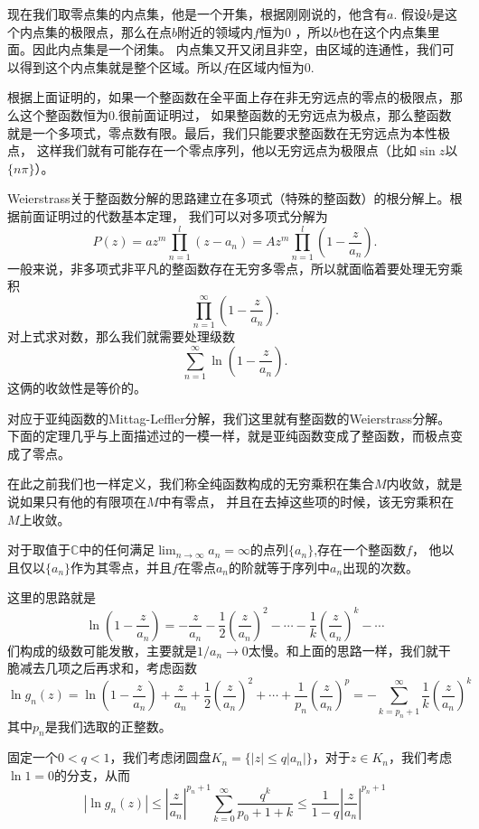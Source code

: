 现在我们取零点集的内点集，他是一个开集，根据刚刚说的，他含有$a$.
假设$b$是这个内点集的极限点，那么在点$b$附近的领域内$f$恒为0 ，所以$b$也在这个内点集里面。因此内点集是一个闭集。
内点集又开又闭且非空，由区域的连通性，我们可以得到这个内点集就是整个区域。所以$f$在区域内恒为0.

根据上面证明的，如果一个整函数在全平面上存在非无穷远点的零点的极限点，那么这个整函数恒为0.很前面证明过，
如果整函数的无穷远点为极点，那么整函数就是一个多项式，零点数有限。最后，我们只能要求整函数在无穷远点为本性极点，
这样我们就有可能存在一个零点序列，他以无穷远点为极限点（比如$\sin z $以$\{n\pi \}$）。

Weierstrass关于整函数分解的思路建立在多项式（特殊的整函数）的根分解上。根据前面证明过的代数基本定理，
我们可以对多项式分解为
\[
P(z)=az^m\prod_{n=1}^l(z-a_n)=Az^m\prod_{n=1}^l\left(1-\frac{z}{a_n}\right).
\]
一般来说，非多项式非平凡的整函数存在无穷多零点，所以就面临着要处理无穷乘积
\[
\prod_{n=1}^\infty\left(1-\frac{z}{a_n}\right).
\]
对上式求对数，那么我们就需要处理级数
\[
\sum_{n=1}^\infty\ln \left(1-\frac{z}{a_n}\right).
\]
这俩的收敛性是等价的。

对应于亚纯函数的Mittag-Leffler分解，我们这里就有整函数的Weierstrass分解。
下面的定理几乎与上面描述过的一模一样，就是亚纯函数变成了整函数，而极点变成了零点。

在此之前我们也一样定义，我们称全纯函数构成的无穷乘积在集合$M$内收敛，就是说如果只有他的有限项在$M$中有零点，
并且在去掉这些项的时候，该无穷乘积在$M$上收敛。
\begin{thm}[Weierstrass分解]
对于取值于$\mathbb{C}$中的任何满足$\lim_{n \to \infty} a_n = \infty$的点列$\{a_n\}$,存在一个整函数$f$，
他以且仅以$\{a_n\}$作为其零点，并且$f$在零点$a_n$的阶就等于序列中$a_n$出现的次数。
\end{thm}
这里的思路就是
\[
\ln \left(1-\frac{z}{a_n}\right)=-\frac{z}{a_n}-\frac{1}{2}\left(\frac{z}{a_n}\right)^2-\cdots-\frac{1}{k}
\left(\frac{z}{a_n}\right)^k-\cdots
\]
们构成的级数可能发散，主要就是$1/a_n\to 0$太慢。和上面的思路一样，我们就干脆减去几项之后再求和，考虑函数
\[
\ln g_n(z)=\ln \left(1-\frac{z}{a_n}\right)+\frac{z}{a_n}+\frac{1}{2}\left(\frac{z}{a_n}\right)^2+\cdots+
\frac{1}{p_n}\left(\frac{z}{a_n}\right)^p=-\sum_{k=p_n+1}^\infty\frac{1}{k}\left(\frac{z}{a_n}\right)^k
\]
其中$p_n$是我们选取的正整数。

固定一个$0<q<1$，我们考虑闭圆盘$K_n=\{|z|\leq q|a_n|\}$，对于$z \in K_n$，我们考虑$\ln 1 =0$的分支，从而
\[
|\ln g_n(z)|\leq \left|\frac{z}{a_n}\right|^{p_n+1}\sum_{k=0}^\infty\frac{q^k}{p_0+1+k}\leq \frac{1}{1-q}
\left|\frac{z}{a_n}\right|^{p_n+1}
\]

